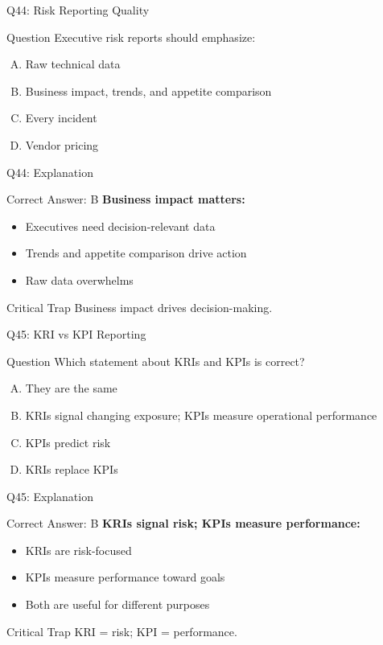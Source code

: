 \documentclass{beamer}
\begin{document}
	\begin{frame}{Q44: Risk Reporting Quality}
		\begin{block}{Question}
			Executive risk reports should emphasize:
		\end{block}
		\begin{enumerate}[(A)]
			\item Raw technical data
			\item Business impact, trends, and appetite comparison
			\item Every incident
			\item Vendor pricing
		\end{enumerate}
	\end{frame}
	
	\begin{frame}{Q44: Explanation}
		\begin{block}{Correct Answer: B}
			\textbf{Business impact matters:}
			\begin{itemize}
				\item Executives need decision-relevant data
				\item Trends and appetite comparison drive action
				\item Raw data overwhelms
			\end{itemize}
		\end{block}
		\begin{alertblock}{Critical Trap}
			Business impact drives decision-making.
		\end{alertblock}
	\end{frame}
	
	\begin{frame}{Q45: KRI vs KPI Reporting}
		\begin{block}{Question}
			Which statement about KRIs and KPIs is correct?
		\end{block}
		\begin{enumerate}[(A)]
			\item They are the same
			\item KRIs signal changing exposure; KPIs measure operational performance
			\item KPIs predict risk
			\item KRIs replace KPIs
		\end{enumerate}
	\end{frame}
	
	\begin{frame}{Q45: Explanation}
		\begin{block}{Correct Answer: B}
			\textbf{KRIs signal risk; KPIs measure performance:}
			\begin{itemize}
				\item KRIs are risk-focused
				\item KPIs measure performance toward goals
				\item Both are useful for different purposes
			\end{itemize}
		\end{block}
		\begin{alertblock}{Critical Trap}
			KRI = risk; KPI = performance.
		\end{alertblock}
	\end{frame}
	
\end{document}

